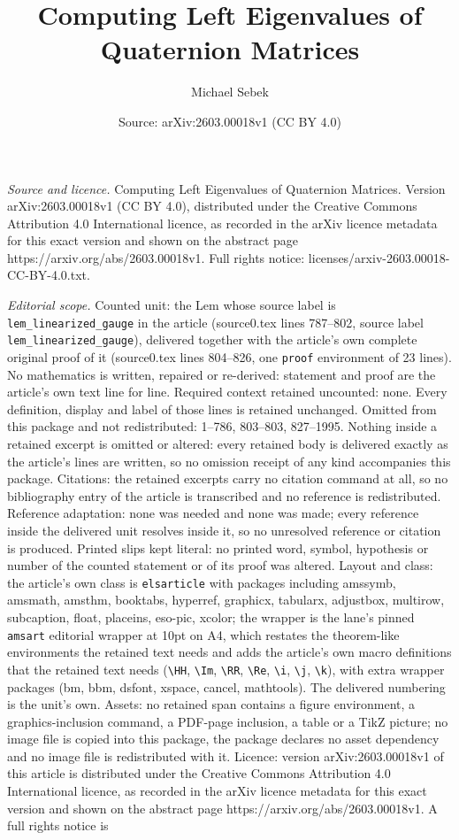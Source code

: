 \documentclass[10pt,a4paper]{amsart}
\title[Computing Left Eigenvalues of Quaternion Matrices]{Computing Left Eigenvalues of Quaternion Matrices}
\author{Michael Sebek}
\date{Source: arXiv:2603.00018v1 (CC BY 4.0)}
\begin{document}
\maketitle

\noindent\emph{Source and licence.} Computing Left Eigenvalues of Quaternion Matrices. Version arXiv:2603.00018v1 (CC BY 4.0), distributed under the Creative Commons Attribution 4.0 International licence, as recorded in the arXiv licence metadata for this exact version and shown on the abstract page https://arxiv.org/abs/2603.00018v1. Full rights notice: licenses/arxiv-2603.00018-CC-BY-4.0.txt.\par\smallskip

\noindent\textit{Editorial scope.} Counted unit: the Lem whose source label is \texttt{lem\_linearized\_gauge} in the article (source0.tex lines 787--802, source label \texttt{lem\_linearized\_gauge}), delivered together with the article's own complete original proof of it (source0.tex lines 804--826, one \texttt{proof} environment of 23 lines). No mathematics is written, repaired or re-derived: statement and proof are the article's own text line for line. Required context retained uncounted: none. Every definition, display and label of those lines is retained unchanged. Omitted from this package and not redistributed: 1--786, 803--803, 827--1995. Nothing inside a retained excerpt is omitted or altered: every retained body is delivered exactly as the article's lines are written, so no omission receipt of any kind accompanies this package. Citations: the retained excerpts carry no citation command at all, so no bibliography entry of the article is transcribed and no reference is redistributed. Reference adaptation: none was needed and none was made; every reference inside the delivered unit resolves inside it, so no unresolved reference or citation is produced. Printed slips kept literal: no printed word, symbol, hypothesis or number of the counted statement or of its proof was altered. Layout and class: the article's own class is \texttt{elsarticle} with packages including amssymb, amsmath, amsthm, booktabs, hyperref, graphicx, tabularx, adjustbox, multirow, subcaption, float, placeins, eso-pic, xcolor; the wrapper is the lane's pinned \texttt{amsart} editorial wrapper at 10pt on A4, which restates the theorem-like environments the retained text needs and adds the article's own macro definitions that the retained text needs (\texttt{\textbackslash HH}, \texttt{\textbackslash Im}, \texttt{\textbackslash RR}, \texttt{\textbackslash Re}, \texttt{\textbackslash i}, \texttt{\textbackslash j}, \texttt{\textbackslash k}), with extra wrapper packages (bm, bbm, dsfont, xspace, cancel, mathtools). The delivered numbering is the unit's own. Assets: no retained span contains a figure environment, a graphics-inclusion command, a PDF-page inclusion, a table or a TikZ picture; no image file is copied into this package, the package declares no asset dependency and no image file is redistributed with it. Licence: version arXiv:2603.00018v1 of this article is distributed under the Creative Commons Attribution 4.0 International licence, as recorded in the arXiv licence metadata for this exact version and shown on the abstract page https://arxiv.org/abs/2603.00018v1. A full rights notice is 
\end{document}
